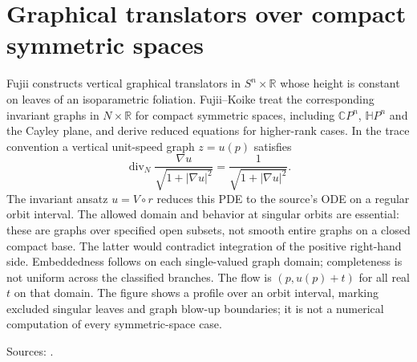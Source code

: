 \chapter{Graphical translators over compact symmetric spaces}\label{sec:catalogue-compact-symmetric-product-translators}
\begin{example}\label{ex:catalogue-compact-symmetric-product-translators}
Fujii constructs vertical graphical translators in $S^n\times\mathbb R$ whose height is constant on leaves of an isoparametric foliation. Fujii--Koike treat the corresponding invariant graphs in $N\times\mathbb R$ for compact symmetric spaces, including $\mathbb CP^n$, $\mathbb HP^n$ and the Cayley plane, and derive reduced equations for higher-rank cases. In the trace convention a vertical unit-speed graph $z=u(p)$ satisfies
\[
 \operatorname{div}_N\frac{\nabla u}{\sqrt{1+|\nabla u|^2}}
 =\frac1{\sqrt{1+|\nabla u|^2}}.
\]
The invariant ansatz $u=V\circ r$ reduces this PDE to the source's ODE on a regular orbit interval. The allowed domain and behavior at singular orbits are essential: these are graphs over specified open subsets, not smooth entire graphs on a closed compact base. The latter would contradict integration of the positive right-hand side. Embeddedness follows on each single-valued graph domain; completeness is not uniform across the classified branches. The flow is $(p,u(p)+t)$ for all real $t$ on that domain. The figure shows a profile over an orbit interval, marking excluded singular leaves and graph blow-up boundaries; it is not a numerical computation of every symmetric-space case.
\par Sources: \cite{CatFujii2024,CatFujiiKoike2023}.
\end{example}

